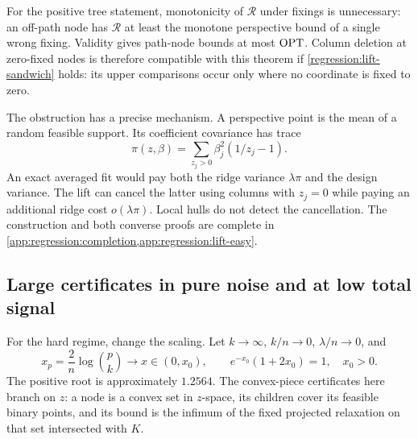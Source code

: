 For the positive tree statement, monotonicity of $\mathcal R$ under
fixings is unnecessary: an off-path node has $\mathcal R$ at least
the monotone perspective bound of a single wrong fixing. Validity gives
path-node bounds at most $\operatorname{OPT}$. Column deletion at zero-fixed nodes
is therefore compatible with this theorem if
\eqref{regression:lift-sandwich} holds: its upper comparisons occur
only where no coordinate is fixed to zero.

The obstruction has a precise mechanism. A perspective point is the
mean of a random feasible support. Its coefficient covariance has trace
\begin{equation}\label{regression:fractional-excess}
 \pi(z,\beta)=\sum_{z_j>0}\beta_j^2(1/z_j-1).
\end{equation}
An exact averaged fit would pay both the ridge variance $\lambda\pi$
and the design variance. The lift can cancel the latter using columns
with $z_j=0$ while paying an additional ridge cost
$o(\lambda\pi)$. Local hulls do not detect the cancellation. The
construction and both converse proofs are complete in
\cref{app:regression:completion,app:regression:lift-easy}.

\subsection{Large certificates in pure noise and at low total signal}
\label{regression:hard}

For the hard regime, change the scaling. Let $k\to\infty$,
$k/n\to0$, $\lambda/n\to0$, and
\begin{equation}\label{regression:hard-regime}
 x_p=\frac2n\log\binom pk\longrightarrow x\in(0,x_0),
 \qquad e^{-x_0}(1+2x_0)=1,\quad x_0>0.
\end{equation}
The positive root is approximately $1.2564$.
The convex-piece certificates here branch on $z$: a node is a convex
set in $z$-space, its children cover its feasible binary points, and
its bound is the infimum of the fixed projected relaxation on that set
intersected with $K$.

